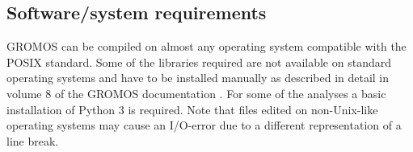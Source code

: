 \subsection{Software/system requirements}
%
GROMOS can be compiled on almost any operating system compatible with the POSIX standard.
 Some of the libraries required are not available on standard operating systems and have to be installed 
manually as described in detail in volume 8 of the GROMOS documentation \cite{volume_8}. 
For some of the analyses a basic installation of Python 3 is required. 
Note that files edited on non-Unix-like operating systems may cause an I/O-error due to a different representation of a line break.
